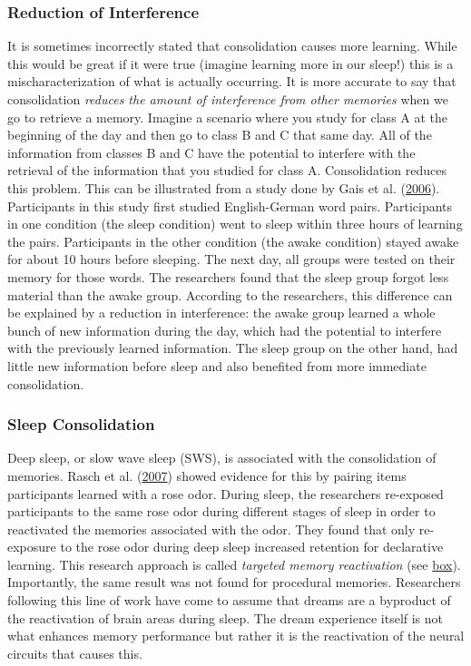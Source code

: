 \documentclass[
]{krantz}
\begin{document}
\hypertarget{reduction-of-interference}{%
\subsubsection*{Reduction of Interference}\label{reduction-of-interference}}


It is sometimes incorrectly stated that consolidation causes more learning. While this would be great if it were true (imagine learning more in our sleep!) this is a mischaracterization of what is actually occurring. It is more accurate to say that consolidation \emph{reduces the amount of interference from other memories} when we go to retrieve a memory. Imagine a scenario where you study for class A at the beginning of the day and then go to class B and C that same day. All of the information from classes B and C have the potential to interfere with the retrieval of the information that you studied for class A. Consolidation reduces this problem. This can be illustrated from a study done by Gais et al. (\protect\hyperlink{ref-Gais2006}{2006}). Participants in this study first studied English-German word pairs. Participants in one condition (the sleep condition) went to sleep within three hours of learning the pairs. Participants in the other condition (the awake condition) stayed awake for about 10 hours before sleeping. The next day, all groups were tested on their memory for those words. The researchers found that the sleep group forgot less material than the awake group. According to the researchers, this difference can be explained by a reduction in interference: the awake group learned a whole bunch of new information during the day, which had the potential to interfere with the previously learned information. The sleep group on the other hand, had little new information before sleep and also benefited from more immediate consolidation.

\hypertarget{sleep-consolidation}{%
\subsubsection*{Sleep Consolidation}\label{sleep-consolidation}}


Deep sleep, or slow wave sleep (SWS), is associated with the consolidation of memories. Rasch et al. (\protect\hyperlink{ref-Rasch2007}{2007}) showed evidence for this by pairing items participants learned with a rose odor. During sleep, the researchers re-exposed participants to the same rose odor during different stages of sleep in order to reactivated the memories associated with the odor. They found that only re-exposure to the rose odor during deep sleep increased retention for declarative learning. This research approach is called \emph{targeted memory reactivation} (see \protect\hyperlink{targeted-memory-reactivation}{box}). Importantly, the same result was not found for procedural memories. Researchers following this line of work have come to assume that dreams are a byproduct of the reactivation of brain areas during sleep. The dream experience itself is not what enhances memory performance but rather it is the reactivation of the neural circuits that causes this.
\end{document}
